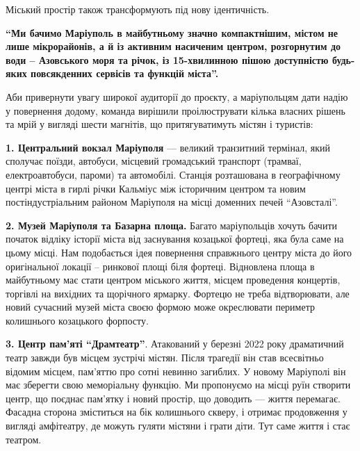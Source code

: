 Міський простір також трансформують під нову ідентичність.

\begin{leftbar}
\begingroup
\bfseries
\enquote{Ми бачимо Маріуполь в майбутньому значно компактнішим, містом не лише
мікрорайонів, а й із активним насиченим центром, розгорнутим до води –
Азовського моря та річок, із 15-хвилинною пішою доступністю будь-яких
повсякденних сервісів та функцій міста}.
\endgroup
\end{leftbar}


Аби привернути увагу широкої аудиторії до проєкту, а маріупольцям дати надію у
повернення додому, команда вирішили проілюструвати кілька власних рішень та
мрій у вигляді шести магнітів, що притягуватимуть містян і туристів:

\textbf{1. Центральний вокзал Маріуполя} — великий транзитний термінал, який сполучає
поїзди, автобуси, місцевий громадський транспорт (трамваї, електроавтобуси,
пароми) та автомобілі. Станція розташована в географічному центрі міста в гирлі
річки Кальміус між історичним центром та новим постіндустріальним районом
Маріуполя на місці доменних печей \enquote{Азовсталі}.


\textbf{2. Музей Маріуполя та Базарна площа.} Багато маріупольців хочуть бачити початок
відліку історії міста від заснування козацької фортеці, яка була саме на цьому
місці. Нам подобається ідея повернення справжнього центру міста до його
оригінальної локації – ринкової площі біля фортеці. Відновлена площа в
майбутньому має стати центром міського життя, місцем проведення концертів,
торгівлі на вихідних та щорічного ярмарку. Фортецю не треба відтворювати, але
новий сучасний музей міста своєю формою може окреслювати периметр колишнього
козацького форпосту.


\textbf{3. Центр пам'яті \enquote{Драмтеатр}}. Атакований у березні 2022 року драматичний театр
завжди був місцем зустрічі містян. Після трагедії він став всесвітньо відомим
місцем, пам'яттю про сотні невинно загиблих. У новому Маріуполі він має
зберегти свою меморіальну функцію. Ми пропонуємо на місці руїн створити центр,
що поєднає пам'ятку і новий простір, що доводить — життя перемагає. Фасадна
сторона зміститься на бік колишнього скверу, і отримає продовження у вигляді
амфітеатру, де можуть гуляти містяни і грати діти. Тут саме життя і стає
театром.

